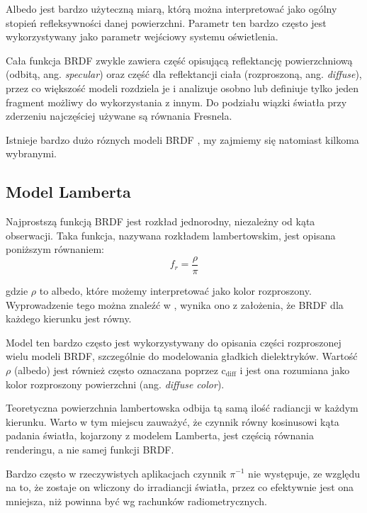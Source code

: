 \documentclass[../main.tex]{subfiles}
\begin{document}
Albedo jest bardzo użyteczną miarą, którą można interpretować jako ogólny stopień refleksywności danej powierzchni. Parametr ten bardzo często jest wykorzystywany jako parametr wejściowy systemu oświetlenia.

Cała funkcja BRDF zwykle zawiera część opisującą reflektancję powierzchniową (odbitą, ang. \textit{specular}) oraz część dla reflektancji ciała (rozproszoną, ang. \textit{diffuse}), przez co większość modeli rozdziela je i analizuje osobno lub definiuje tylko jeden fragment możliwy do wykorzystania z innym. Do podziału wiązki światła przy zderzeniu najczęściej używane są równania Fresnela.

Istnieje bardzo dużo róznych modeli BRDF \cite{brdf_overview}, my zajmiemy się natomiast kilkoma wybranymi.

\subsection{Model Lamberta}

Najprostszą funkcją BRDF jest rozkład jednorodny, niezależny od kąta obserwacji. Taka funkcja, nazywana rozkładem lambertowskim, jest opisana poniższym równaniem:
\begin{equation}
  f_r = \frac{\rho}{\pi}
\end{equation}

\noindent gdzie $\rho$ to albedo, które możemy interpretować jako kolor rozproszony. Wyprowadzenie tego można znaleźć w \cite{RealTimeRendering2008, pbr_games_siggraph}, wynika ono z założenia, że BRDF dla każdego kierunku jest równy.

Model ten bardzo często jest wykorzystywany do opisania części rozproszonej wielu modeli BRDF, szczególnie do modelowania gładkich dielektryków. Wartość $\rho$ (albedo) jest również często oznaczana poprzez $\text{c}_{\text{diff}}$ i jest ona rozumiana jako kolor rozproszony powierzchni (ang. \textit{diffuse color}).

Teoretyczna powierzchnia lambertowska odbija tą samą ilość radiancji w każdym kierunku. Warto w tym miejscu zauważyć, że czynnik równy kosinusowi kąta padania światła, kojarzony z modelem Lamberta, jest częścią równania renderingu, a nie samej funkcji BRDF.

Bardzo często w rzeczywistych aplikacjach czynnik $\pi^{-1}$ nie występuje, ze względu na to, że zostaje on wliczony do irradiancji światła, przez co efektywnie jest ona mniejsza, niż powinna być wg rachunków radiometrycznych. 
\end{document}
